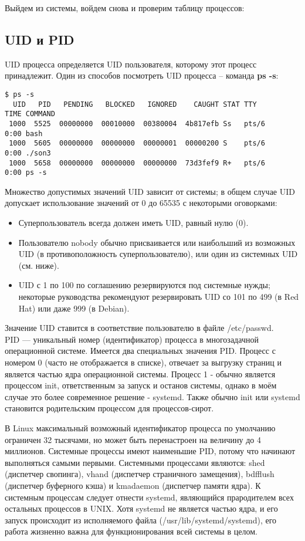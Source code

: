 \documentclass[a4paper]{article}
\begin{document}
	Выйдем из системы, войдем снова и проверим таблицу процессов:
		
	
	\subsection{UID и PID}
	UID процесса определяется UID пользователя, которому этот процесс принадлежит. Один из способов посмотреть UID процесса -- команда \textbf{ps -s}:
	\begin{lstlisting}[style=crs_bash]	
$ ps -s
  UID   PID   PENDING   BLOCKED   IGNORED    CAUGHT STAT TTY        TIME COMMAND
 1000  5525  00000000  00010000  00380004  4b817efb Ss   pts/6      0:00 bash
 1000  5605  00000000  00000000  00000001  00000200 S    pts/6      0:00 ./son3
 1000  5658  00000000  00000000  00000000  73d3fef9 R+   pts/6      0:00 ps -s
	\end{lstlisting}
	
	Множество допустимых значений UID зависит от системы; в общем случае UID допускает использование значений от 0 до 65535 с некоторыми оговорками:
	\begin{itemize}
		\item Суперпользователь всегда должен иметь UID, равный нулю (0).
		\item Пользователю nobody обычно присваивается или наибольший из возможных UID (в противоположность суперпользователю), или один из системных UID (см. ниже).
		\item UID с 1 по 100 по соглашению резервируются под системные нужды; некоторые руководства рекомендуют резервировать UID со 101 по 499 (в Red Hat) или даже 999 (в Debian).	
	\end{itemize}
	
	Значение UID ставится в соответствие пользователю в файле /etc/passwd.\\
	
	 PID --- уникальный номер (идентификатор) процесса в многозадачной операционной системе. Имеется два специальных значения PID. Процесс с номером 0 (часто не отображается в списке), отвечает за выгрузку страниц и является частью ядра операционной системы. Процесс 1 - обычно является процессом init, ответственным за запуск и останов системы, однако в моём случае это более современное решение - systemd. Также обычно init или systemd становится родительским процессом для процессов-сирот.

	В Linux максимальный возможный идентификатор процесса по умолчанию ограничен 32 тысячами, но может быть перенастроен на величину до 4 миллионов. Системные процессы имеют наименьшие PID, потому что начинают выполняться самыми первыми. Системными процессами являются: shed (диспетчер свопинга), vhand (диспетчер страничного замещения), bdfflush (диспетчер буферного кэша) и kmadaemon (диспетчер памяти ядра). К системным процессам следует отнести systemd, являющийся прародителем всех остальных процессов в UNIX. Хотя systemd не является частью ядра, и его запуск происходит из исполняемого файла (/usr/lib/systemd/systemd), его работа жизненно важна для функционирования всей системы в целом.
	
\end{document}
